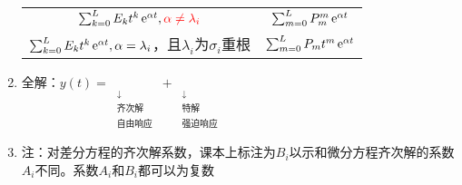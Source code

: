 \documentclass{article}
\begin{document}
\begin{enumerate}[label=(\arabic*)]
\begin{table}[H]
\begin{tabular}{c|c}
						$\sum_{k=0}^{L}E_{k}t^{k}\operatorname{e}^{\alpha t},\color{red} \alpha\neq\lambda_i$ & $\sum_{m=0}^{L}P_{m}^{m}\operatorname{e}^{\alpha t}$ \\
						$\sum_{k=0}^{L}E_{k}t^{k}\operatorname{e}^{\alpha t},\alpha=\lambda_i$，且$\lambda_i$为$\sigma_i$重根 & $\sum_{m=0}^{L}P_{m}t^{m}\operatorname{e}^{\alpha t}$ \\
						\bottomrule
					\end{tabular}
				\end{table}
	\item 全解：$y(t) = \mathop{y_{H}(t)}\limits_{\substack{\downarrow\\ \text{齐次解} \\ \text{自由响应}}} + \mathop{y_{P}(t)}\limits_{\substack{\downarrow\\ \text{特解} \\ \text{强迫响应}}}$
	\item {\red 注：}对差分方程的齐次解系数，课本上标注为$B_{i}$以示和微分方程齐次解的系数$A_{i}$不同。系数$A_{i}$和$B_{i}$都可以为复数
\end{enumerate}
\end{document}

